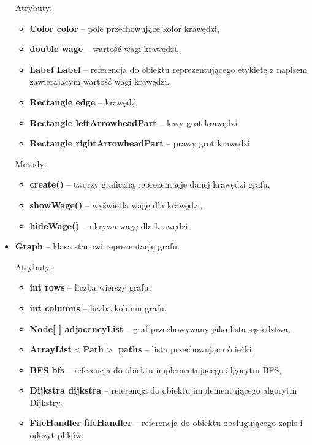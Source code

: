 \documentclass{article}
\begin{document}
\begin{itemize}
    Atrybuty:
    \begin{itemize}
        \item \textbf{Color color} -- pole przechowujące kolor krawędzi,
        \item \textbf{double wage} -- wartość wagi krawędzi,
        \item \textbf{Label Label} -- referencja do obiektu reprezentującego etykietę z napisem zawierającym wartość wagi krawędzi.
        \item \textbf{Rectangle edge} -- krawędź
        \item \textbf{Rectangle leftArrowheadPart} -- lewy grot krawędzi
        \item \textbf{Rectangle rightArrowheadPart} -- prawy grot krawędzi
    \end{itemize}
    
    Metody:
    \begin{itemize}
        \item \textbf{create()} -- tworzy graficzną reprezentację danej krawędzi grafu,
        \item \textbf{showWage()} -- wyświetla wagę dla krawędzi,
        \item \textbf{hideWage()} -- ukrywa wagę dla krawędzi.
    \end{itemize}
    
\newpage
    
    \item \textbf{Graph} -- klasa stanowi reprezentację grafu.
    
    Atrybuty:
    \begin{itemize}
        \item \textbf{int rows} -- liczba wierszy grafu,
        \item \textbf{int columns} -- liczba kolumn grafu,
        \item \textbf{Node[ ] adjacencyList} -- graf przechowywany jako lista sąsiedztwa,
        \item \textbf{ArrayList$<$Path$>$ paths} -- lista przechowująca ścieżki,
        \item \textbf{BFS bfs} -- referencja do obiektu implementującego algorytm BFS,
        \item \textbf{Dijkstra dijkstra} -- referencja do obiektu implementującego algorytm Dijkstry,
        \item \textbf{FileHandler fileHandler} -- referencja do obiektu obsługującego zapis i odczyt plików.
    \end{itemize}
    

\end{itemize}
\end{document}
